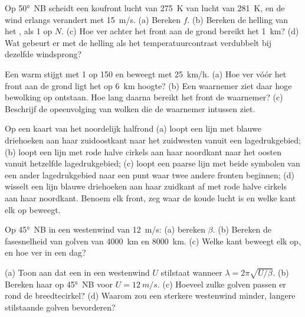 \begin{exercise}[$\star$]\label{exo:b2:weather-systems:1}
Op \ang{50}~NB scheidt een koufront lucht van \qty{275}{K} van lucht van \qty{281}{K}, en de wind
erlangs verandert met \qty{15}{m/s}. (a) Bereken $f$. (b) Bereken de helling van het ,
als 1 op $N$. (c) Hoe ver achter het front aan de grond bereikt het 
\qty{1}{km}? (d) Wat gebeurt er met de helling als het temperatuurcontrast verdubbelt bij dezelfde
windsprong?
\end{exercise}

\begin{exercise}[$\star$]\label{exo:b2:weather-systems:2}
Een warm  stijgt met 1 op 150 en beweegt met \qty{25}{km/h}. (a) Hoe ver vóór het
front aan de grond ligt het  op \qty{6}{km} hoogte? (b) Een waarnemer ziet daar hoge bewolking
op ontstaan. Hoe lang daarna bereikt het front de waarnemer? (c) Beschrijf de opeenvolging van
wolken die de waarnemer intussen ziet.
\end{exercise}

\begin{exercise}[$\star$]\label{exo:b2:weather-systems:3}
Op een kaart van het noordelijk halfrond (a) loopt een lijn met blauwe driehoeken aan haar zuidoostkant naar het zuidwesten
vanuit een lagedrukgebied; (b) loopt een lijn met rode halve cirkels aan haar noordkant naar het oosten vanuit hetzelfde lagedrukgebied; (c) loopt een
paarse lijn met beide symbolen van een ander lagedrukgebied naar een punt waar twee andere fronten beginnen;
(d) wisselt een lijn blauwe driehoeken aan haar zuidkant af met rode halve cirkels aan haar noordkant.
Benoem elk front, zeg waar de koude lucht is en welke kant elk op beweegt.
\end{exercise}

\begin{exercise}[$\star$]\label{exo:b2:weather-systems:4}
Op \ang{45}~NB in een westenwind van \qty{12}{m/s}: (a) bereken $\beta$. (b) Bereken de fasesnelheid
van golven van \qty{4000}{km} en \qty{8000}{km}. (c) Welke kant beweegt elk op, en hoe ver in een
dag?
\end{exercise}

\begin{exercise}[$\star\star$]\label{exo:b2:weather-systems:5}
(a) Toon aan dat een  in een westenwind $U$ stilstaat wanneer $\lambda = 2\pi\sqrt{U/\beta}$.
(b) Bereken haar op \ang{45}~NB voor $U = \qty{12}{m/s}$. (c) Hoeveel zulke golven passen er rond de
breedtecirkel? (d) Waarom zou een sterkere westenwind minder, langere stilstaande golven bevorderen?
\end{exercise}

